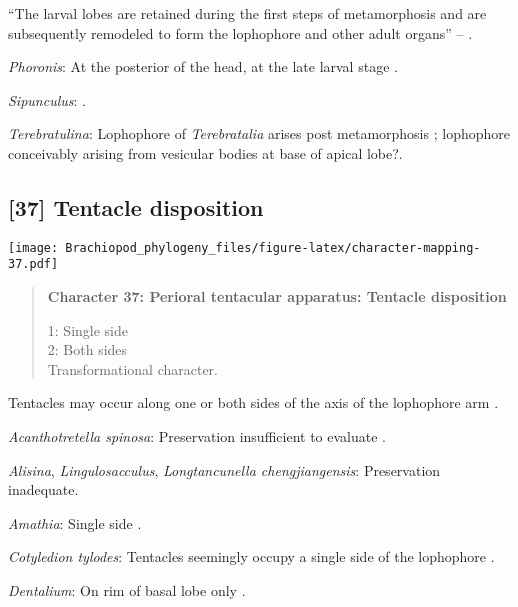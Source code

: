 \documentclass[openany]{book}
\theoremstyle{definition}
\theoremstyle{definition}
\theoremstyle{definition}
\theoremstyle{remark}
\begin{document}
``The larval lobes are retained during the first steps of metamorphosis
and are\\
subsequently remodeled to form the lophophore and other adult organs''
-- \citet{Altenburger2013}.

\hypertarget{Phoronis-coding-36}{}
\emph{Phoronis}: At the posterior of the head, at the late larval stage
\citep{Santagata2004}.

\hypertarget{Sipunculus-coding-36}{}
\emph{Sipunculus}: \citep{Adrianov2006}.

\hypertarget{Terebratulina-coding-36}{}
\emph{Terebratulina}: Lophophore of \emph{Terebratalia} arises post
metamorphosis \citep{Young2002}; lophophore conceivably arising from
vesicular bodies at base of apical lobe?.

\subsection*{{[}37{]} Tentacle disposition}\label{tentacle-disposition}

\texttt{[image: Brachiopod\_phylogeny\_files/figure-latex/character-mapping-37.pdf]}

\begin{quote}
\textbf{Character 37: Perioral tentacular apparatus: Tentacle
disposition}

1: Single side\\
2: Both sides\\
Transformational character.
\end{quote}

Tentacles may occur along one or both sides of the axis of the
lophophore arm \citep{Carlson1995Phylogeneticrelationships}.

\hypertarget{Acanthotretella_spinosa-coding-37}{}
\emph{Acanthotretella spinosa}: Preservation insufficient to evaluate
\citep{Holmer2006Aspinose}.

\hypertarget{Alisina-coding-37}{}
\emph{Alisina}, \emph{Lingulosacculus}, \emph{Longtancunella
chengjiangensis}: Preservation inadequate.

\hypertarget{Amathia-coding-37}{}
\emph{Amathia}: Single side \citep{Temereva2016Thenervous}.

\hypertarget{Cotyledion_tylodes-coding-37}{}
\emph{Cotyledion tylodes}: Tentacles seemingly occupy a single side of
the lophophore \citep{Zhang2013}.

\hypertarget{Dentalium-coding-37}{}
\emph{Dentalium}: On rim of basal lobe only \citep{Morton1959}.
\end{document}
